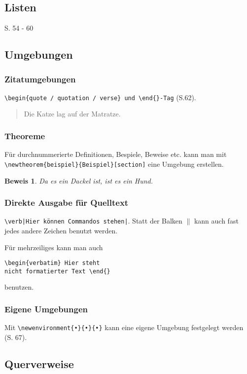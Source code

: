 \documentclass[12pt,a4paper]{article}
\newtheorem{beweis}{Beweis}[section]
\begin{document}
\subsection{Listen}
S. 54 - 60

\subsection{Umgebungen}

\subsubsection{Zitatumgebungen}
\verb|\begin{quote / quotation / verse} und \end{}-Tag| (S.62).
\begin{quote}
Die Katze lag auf der Matratze.
\end{quote}

\subsubsection{Theoreme}
Für durchnummerierte Definitionen, Bespiele, Beweise etc. kann man mit
\verb|\newtheorem{beispiel}{Beispiel}[section]| eine Umgebung erstellen.
\begin{beweis}
Da es ein Dackel ist, ist es ein Hund.
\end{beweis}

\subsubsection{Direkte Ausgabe für Quelltext}
\verb+\verb|Hier können Commandos stehen|+.
Statt der Balken $\|$ kann auch fast jedes andere Zeichen benutzt werden.

\bigskip

Für mehrzeiliges kann man auch \begin{verbatim}
\begin{verbatim} Hier steht
nicht formatierter Text \end{}
\end{verbatim} benutzen.


\subsubsection{Eigene Umgebungen}

Mit \verb|\newenvironment{•}{•}{•}| kann eine eigene Umgebung festgelegt werden (S. 67).


\subsection{Querverweise}
\end{document}
